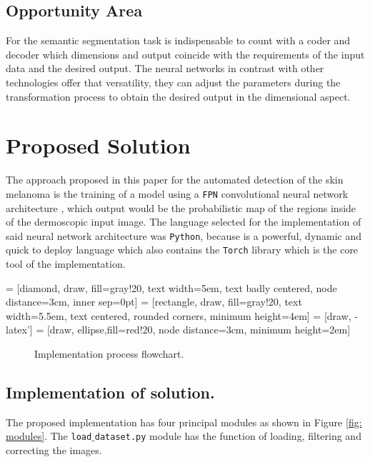 \subsection{Opportunity Area}
For the semantic segmentation task is indispensable to count with a coder and decoder which dimensions and output coincide with the requirements of the input data and the desired output. The neural networks in contrast with other technologies offer that versatility, they can adjust the parameters during the transformation process to obtain the desired output in the dimensional aspect.  

\section{Proposed Solution}
The approach proposed in this paper for the automated detection of the skin melanoma is the training of a model using a \texttt{FPN} convolutional neural network architecture \citep{fpn_2}, which output would be the probabilistic map of the regions inside of the dermoscopic input image. The language selected for the implementation of said neural network architecture was \texttt{Python}, because is a powerful, dynamic and quick to deploy language which also contains the \texttt{Torch} library which is the core tool of the implementation.

 = [diamond, draw, fill=gray!20, 
    text width=5em, text badly centered, node distance=3cm, inner sep=0pt]
 = [rectangle, draw, fill=gray!20, 
    text width=5.5em, text centered, rounded corners, minimum height=4em]
 = [draw, -latex']
 = [draw, ellipse,fill=red!20, node distance=3cm,
    minimum height=2em]

\begin{figure}[h]
\centering    
{}
\caption{Implementation process flowchart.}
\end{figure}

\subsection{Implementation of solution.}
The proposed implementation has four principal modules as shown in Figure \ref{fig: modules}. The \texttt{load$\_$dataset.py} module has the function of loading, filtering and correcting the images.

